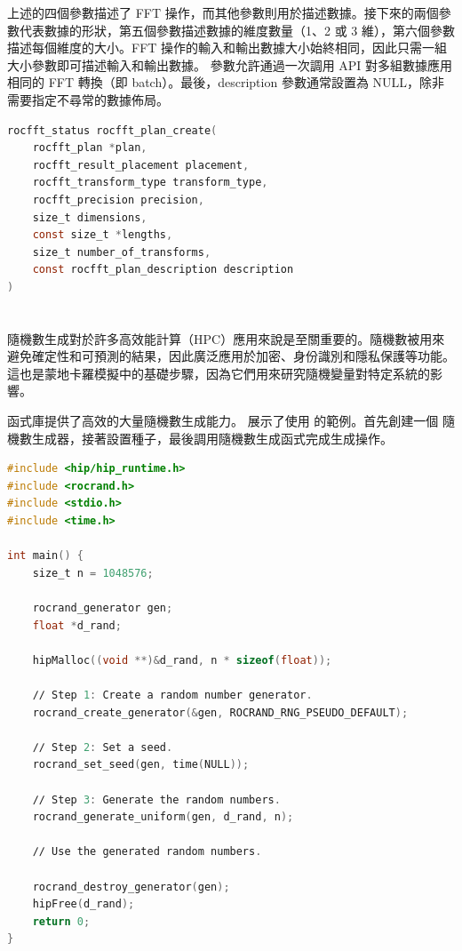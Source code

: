 上述的四個參數描述了 FFT 操作，而其他參數則用於描述數據。接下來的兩個參數代表數據的形狀，第五個參數描述數據的維度數量（1、2 或 3 維），第六個參數描述每個維度的大小。FFT 操作的輸入和輸出數據大小始終相同，因此只需一組大小參數即可描述輸入和輸出數據。 參數允許通過一次調用  API 對多組數據應用相同的 FFT 轉換（即 batch）。最後，description 參數通常設置為 NULL，除非需要指定不尋常的數據佈局。

\begin{lstlisting}[language=C, caption={\term{rocfft\_plan\_create} 函式的部署。}, captionpos=t, label={lst:Signature}]
rocfft_status rocfft_plan_create(
    rocfft_plan *plan,
    rocfft_result_placement placement,
    rocfft_transform_type transform_type,
    rocfft_precision precision,
    size_t dimensions,
    const size_t *lengths,
    size_t number_of_transforms,
    const rocfft_plan_description description
)
\end{lstlisting}

\section{}
隨機數生成對於許多高效能計算（HPC）應用來說是至關重要的。隨機數被用來避免確定性和可預測的結果，因此廣泛應用於加密、身份識別和隱私保護等功能。這也是蒙地卡羅模擬中的基礎步驟，因為它們用來研究隨機變量對特定系統的影響。

 函式庫提供了高效的大量隨機數生成能力。 展示了使用  的範例。首先創建一個  隨機數生成器，接著設置種子，最後調用隨機數生成函式完成生成操作。

\begin{lstlisting}[language=C, caption={一個生成 100 萬個偽隨機數的 \term{rocRAND} 函式。}, captionpos=t, label={lst:rocRAND}]
#include <hip∕hip_runtime.h>
#include <rocrand.h>
#include <stdio.h>
#include <time.h>

int main() {
    size_t n = 1048576;

    rocrand_generator gen;
    float *d_rand;

    hipMalloc((void **)&d_rand, n * sizeof(float));

    ∕∕ Step 1: Create a random number generator.
    rocrand_create_generator(&gen, ROCRAND_RNG_PSEUDO_DEFAULT);

    ∕∕ Step 2: Set a seed.
    rocrand_set_seed(gen, time(NULL));

    ∕∕ Step 3: Generate the random numbers.
    rocrand_generate_uniform(gen, d_rand, n);

    ∕∕ Use the generated random numbers.

    rocrand_destroy_generator(gen);
    hipFree(d_rand);
    return 0;
}
\end{lstlisting}

